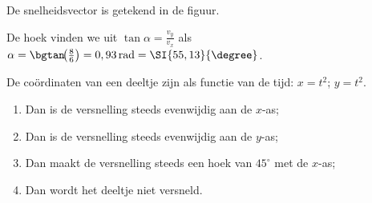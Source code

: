 \documentclass{ximera}
\begin{document}
\begin{exercise}
\begin{oplossing}
De snelheidsvector is getekend in de figuur.

De hoek vinden we uit $\tan\alpha=\frac{v_y}{v_x}$ als $\alpha=\bgtan\!{\left(\frac{8}{6}\right)}=0,93\rm\,rad=\SI{55,13}{\degree}$.
\end{oplossing}


\end{exercise}

\begin{exercise}

De coördinaten van een deeltje zijn als functie van de tijd:
$x=t^2$; $y=t^2$.
\begin{enumerate}
\item Dan is de versnelling steeds evenwijdig aan de $x$-as;
\item Dan is de versnelling steeds evenwijdig aan de $y$-as;
\item Dan maakt de versnelling steeds een hoek van $45^\circ$ met de $x$-as;
\item Dan wordt het deeltje niet versneld.
\end{enumerate}

\end{exercise}
\end{document}
